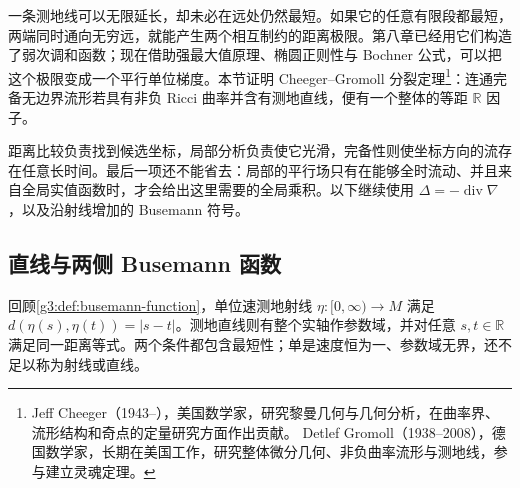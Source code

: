 
% 
% 
% 


一条测地线可以无限延长，却未必在远处仍然最短。如果它的任意有限段都最短，两端同时通向无穷远，就能产生两个相互制约的距离极限。第八章已经用它们构造了弱次调和函数；现在借助强最大值原理、椭圆正则性与 Bochner 公式，可以把这个极限变成一个平行单位梯度。本节证明 Cheeger--Gromoll 分裂定理\footnote{Jeff Cheeger（1943--），美国数学家，研究黎曼几何与几何分析，在曲率界、流形结构和奇点的定量研究方面作出贡献。 Detlef Gromoll（1938--2008），德国数学家，长期在美国工作，研究整体微分几何、非负曲率流形与测地线，参与建立灵魂定理。}：连通完备无边界流形若具有非负 Ricci 曲率并含有测地直线，便有一个整体的等距 \(\mathbb R\) 因子。

\ProseParagraphBreak

距离比较负责找到候选坐标，局部分析负责使它光滑，完备性则使坐标方向的流存在任意长时间。最后一项还不能省去：局部的平行场只有在能够全时流动、并且来自全局实值函数时，才会给出这里需要的全局乘积。以下继续使用 \(\Delta=-\operatorname{div}\nabla\)，以及沿射线增加的 Busemann 符号。

\subsection{直线与两侧 Busemann 函数}
\label{g3:subsec:1505:01}
回顾\cref{g3:def:busemann-function}，单位速测地射线 \(\eta:[0,\infty)\to M\) 满足 \(d(\eta(s),\eta(t))=|s-t|\)。测地直线则有整个实轴作参数域，并对任意 \(s,t\in\mathbb R\) 满足同一距离等式。两个条件都包含最短性；单是速度恒为一、参数域无界，还不足以称为射线或直线。

